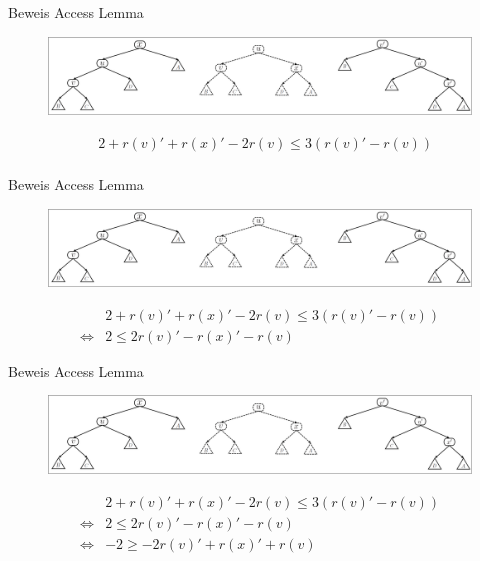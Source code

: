 \documentclass[11pt]{beamer}
\begin{document}
\begin{frame}{Beweis Access Lemma}
	\begin{figure}[H]
		\centering
		\includegraphics[width=1\textwidth]{"Medien/pres/zigZigKlein"}
		
	\end{figure}
	\begin{align*}
	&	2 + r\left(v\right)' + r\left(x\right)' - 2 r\left(v\right) \leq  3\left(r\left(v\right)'- r\left(v\right)\right)\\
	\end{align*}
	
\end{frame}

\begin{frame}{Beweis Access Lemma}
	\begin{figure}[H]
		\centering
		\includegraphics[width=1\textwidth]{"Medien/pres/zigZigKlein"}
		
	\end{figure}
	\begin{align*}
	&	2 + r\left(v\right)' + r\left(x\right)' - 2 r\left(v\right) \leq  3\left(r\left(v\right)'- r\left(v\right)\right)\\
	\Leftrightarrow &2 \leq 2r\left(v\right)' -  r\left(x\right)' - r\left(v\right)
	\end{align*}
	
\end{frame}


\begin{frame}{Beweis Access Lemma}
	\begin{figure}[H]
		\centering
		\includegraphics[width=1\textwidth]{"Medien/pres/zigZigKlein"}
		
	\end{figure}
	\begin{align*}
	&	2 + r\left(v\right)' + r\left(x\right)' - 2 r\left(v\right) \leq  3\left(r\left(v\right)'- r\left(v\right)\right)\\	
	\Leftrightarrow &2 \leq 2r\left(v\right)' -  r\left(x\right)' - r\left(v\right)\\
	\Leftrightarrow & -2 \geq -2r\left(v\right)' +  r\left(x\right)' + r\left(v\right)
	\end{align*}
	
\end{frame}
\end{document}
